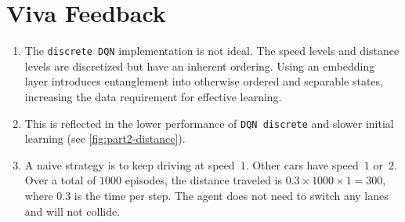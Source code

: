 \section{Viva Feedback}
\begin{enumerate}
\item 
The \texttt{discrete DQN} implementation is not ideal. The speed levels and distance levels are discretized but have an inherent ordering. Using an embedding layer introduces entanglement into otherwise ordered and separable states, increasing the data requirement for effective learning.

\item This is reflected in the lower performance of \texttt{DQN discrete} and slower initial learning (see \autoref{fig:part2-distance}).

\item A naive strategy is to keep driving at speed~$1$. Other cars have speed~$1$ or~$2$. Over a total of $1000$ episodes, the distance traveled is $0.3 \times 1000 \times 1 = 300$, where $0.3$ is the time per step. The agent does not need to switch any lanes and will not collide.
\end{enumerate}
